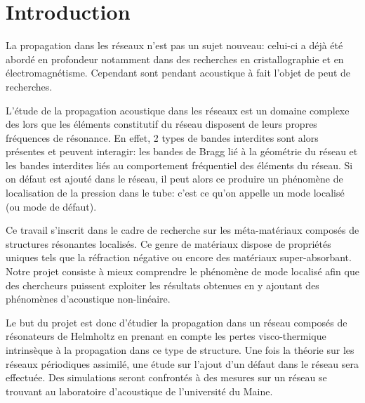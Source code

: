 \chapter*{Introduction}


La propagation dans les réseaux n'est pas un sujet nouveau: celui-ci a déjà été abordé en profondeur notamment dans des recherches en cristallographie et en électromagnétisme. Cependant sont pendant acoustique à fait l'objet de peut de recherches.

L'étude de la propagation acoustique dans les réseaux est un domaine complexe des lors que les éléments constitutif du réseau disposent de leurs propres fréquences de résonance. En effet, 2 types de bandes interdites sont alors présentes et peuvent interagir: les bandes de Bragg lié à la géométrie du réseau et les bandes interdites liés au comportement fréquentiel des éléments du réseau. Si on défaut est ajouté dans le réseau, il peut alors ce produire un phénomène de localisation de la pression dans le tube: c'est ce qu'on appelle un mode localisé (ou mode de défaut).

Ce travail s'inscrit dans le cadre de recherche sur les méta-matériaux composés de structures résonantes localisés. Ce genre de matériaux dispose de propriétés uniques tels que la réfraction négative ou encore des matériaux super-absorbant. Notre projet consiste à mieux comprendre le phénomène de mode localisé afin que des chercheurs puissent exploiter les résultats obtenues en y ajoutant des phénomènes d'acoustique non-linéaire.

\bigskip
Le but du projet est donc d'étudier la propagation dans un réseau composés de résonateurs de Helmholtz en prenant en compte les pertes visco-thermique intrinsèque à la propagation dans ce type de structure. Une fois la théorie sur les réseaux périodiques assimilé, une étude sur l'ajout d'un défaut dans le réseau sera effectuée. Des simulations seront confrontés à des mesures sur un réseau se trouvant au laboratoire d'acoustique de l'université du Maine.

%
